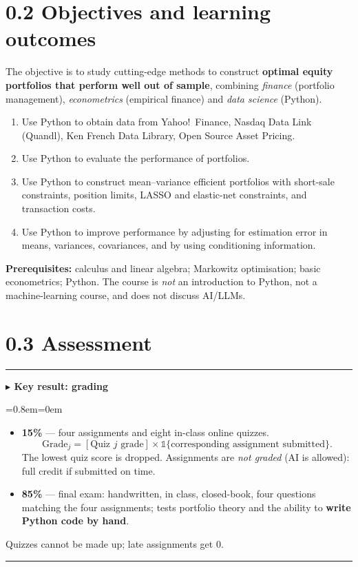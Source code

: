 \documentclass[11pt,a4paper]{report}
\newenvironment{notebox}[1]
  {\par\medskip\Needspace{6\baselineskip}\noindent\rule{\linewidth}{0.4pt}\par\nopagebreak
   \noindent\textbf{#1}\par\nopagebreak
   \begin{list}{}{\leftmargin=0.8em\rightmargin=0em\topsep=2pt}\item[]}
  {\end{list}\nopagebreak\noindent\rule{\linewidth}{0.4pt}\par\medskip}
\newenvironment{keybox}[1][]{\begin{notebox}{$\blacktriangleright$ Key result#1}}{\end{notebox}}
\begin{document}
\section*{0.2 Objectives and learning outcomes}
The objective is to study cutting-edge methods to construct \textbf{optimal
equity portfolios that perform well out of sample}, combining
\emph{finance} (portfolio management), \emph{econometrics} (empirical finance)
and \emph{data science} (Python).

\begin{enumerate}[label=\textbf{LO\arabic*}]
  \item Use Python to obtain data from Yahoo!\ Finance, Nasdaq Data Link
        (Quandl), Ken French Data Library, Open Source Asset Pricing.
  \item Use Python to evaluate the performance of portfolios.
  \item Use Python to construct mean--variance efficient portfolios with
        short-sale constraints, position limits, LASSO and elastic-net
        constraints, and transaction costs.
  \item Use Python to improve performance by adjusting for estimation error in
        means, variances, covariances, and by using conditioning information.
\end{enumerate}

\textbf{Prerequisites:} calculus and linear algebra; Markowitz optimisation;
basic econometrics; Python. The course is \emph{not} an introduction to Python,
not a machine-learning course, and does not discuss AI/LLMs.

\section*{0.3 Assessment}
\begin{keybox}[: grading]
\begin{itemize}
  \item \textbf{15\%} --- four assignments and eight in-class online quizzes.
    \[
      \text{Grade}_j = [\text{Quiz } j \text{ grade}] \times
      \mathbb{1}\{\text{corresponding assignment submitted}\}.
    \]
    The lowest quiz score is dropped. Assignments are \emph{not graded}
    (AI is allowed): full credit if submitted on time.
  \item \textbf{85\%} --- final exam: handwritten, in class, closed-book,
    four questions matching the four assignments; tests portfolio theory and
    the ability to \textbf{write Python code by hand}.
\end{itemize}
Quizzes cannot be made up; late assignments get 0.
\end{keybox}
\end{document}
